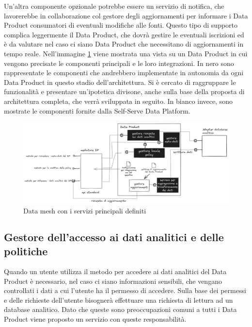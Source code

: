 \documentclass[12pt]{report}
\begin{document}
Un'altra componente opzionale potrebbe essere un servizio di notifica, che lavorerebbe in collaborazione col gestore degli aggiornamenti per informare i Data Product consumatori di eventuali modifiche alle fonti. 
Questo tipo di supporto complica leggermente il Data Product, che dovrà gestire le eventuali iscrizioni ed è da valutare nel caso ci siano Data Product che necessitano di aggiornamenti in tempo reale.
Nell'immagine \ref{fig:dp supporto aggiornamenti} viene mostrata una vista su un Data Product in cui vengono precisate le componenti principali e le loro integrazioni.
In nero sono rappresentate le componenti che andrebbero implementate in autonomia da ogni Data Product in questo stadio dell'architettura.
Si è cercato di raggruppare le funzionalità e presentare un'ipotetica divisone, anche sulla base della proposta di architettura completa, che verrà sviluppata in seguito.
In bianco invece, sono mostrate le componenti fornite dalla Self-Serve Data Platform. 
\begin{figure}
    \centering
    \includegraphics[width=1\linewidth]{immagini/Data Mesh supporto agli aggiornamenti 2024-03-08 15.55.58.excalidraw.png}
    \caption{Data mesh con i servizi principali definiti}
    \label{fig:dp supporto aggiornamenti}
\end{figure}

\subsection{Gestore dell'accesso ai dati analitici e delle politiche}
Quando un utente utilizza il metodo per accedere ai dati analitici del Data Product è necessario, nel caso ci siano informazioni sensibili, che vengano controllati i dati a cui l'utente ha il permesso di accedere.
Sulla base dei permessi e delle richieste dell'utente bisognerà effettuare una richiesta di lettura ad un database analitico.
Dato che queste sono preoccupazioni comuni a tutti i Data Product viene proposto un servizio con queste responsabilità.
\end{document}
